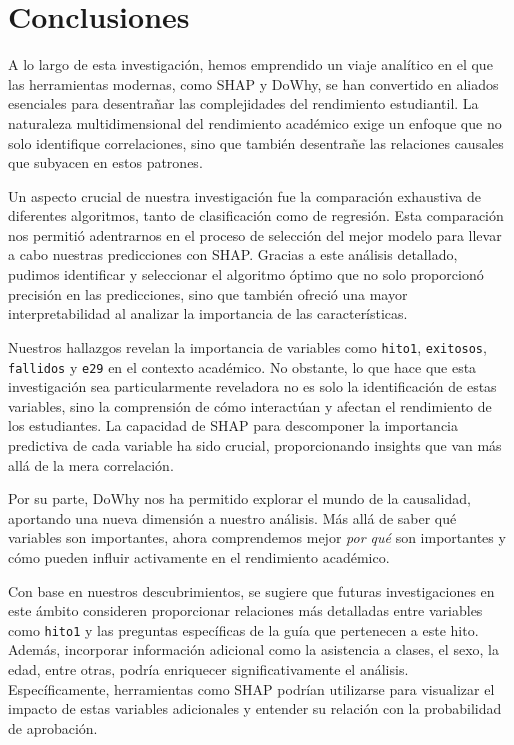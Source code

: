 \hypertarget{Conclusiones}{%
    \section{Conclusiones}\label{Conclusiones}}

A lo largo de esta investigación, hemos emprendido un viaje analítico en el que las herramientas modernas, como SHAP y DoWhy, se han convertido en aliados esenciales para desentrañar las complejidades del rendimiento estudiantil. La naturaleza multidimensional del rendimiento académico exige un enfoque que no solo identifique correlaciones, sino que también desentrañe las relaciones causales que subyacen en estos patrones.

Un aspecto crucial de nuestra investigación fue la comparación exhaustiva de diferentes algoritmos, tanto de clasificación como de regresión. Esta comparación nos permitió adentrarnos en el proceso de selección del mejor modelo para llevar a cabo nuestras predicciones con SHAP. Gracias a este análisis detallado, pudimos identificar y seleccionar el algoritmo óptimo que no solo proporcionó precisión en las predicciones, sino que también ofreció una mayor interpretabilidad al analizar la importancia de las características.

Nuestros hallazgos revelan la importancia de variables como \texttt{hito1}, \texttt{exitosos}, \texttt{fallidos} y \texttt{e29} en el contexto académico. No obstante, lo que hace que esta investigación sea particularmente reveladora no es solo la identificación de estas variables, sino la comprensión de cómo interactúan y afectan el rendimiento de los estudiantes. La capacidad de SHAP para descomponer la importancia predictiva de cada variable ha sido crucial, proporcionando insights que van más allá de la mera correlación.

Por su parte, DoWhy nos ha permitido explorar el mundo de la causalidad, aportando una nueva dimensión a nuestro análisis. Más allá de saber qué variables son importantes, ahora comprendemos mejor \textit{por qué} son importantes y cómo pueden influir activamente en el rendimiento académico.

Con base en nuestros descubrimientos, se sugiere que futuras investigaciones en este ámbito consideren proporcionar relaciones más detalladas entre variables como \texttt{hito1} y las preguntas específicas de la guía que pertenecen a este hito. Además, incorporar información adicional como la asistencia a clases, el sexo, la edad, entre otras, podría enriquecer significativamente el análisis. Específicamente, herramientas como SHAP podrían utilizarse para visualizar el impacto de estas variables adicionales y entender su relación con la probabilidad de aprobación.

